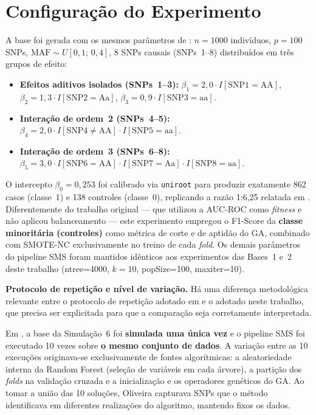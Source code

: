\documentclass[
    12pt,
    a4paper,
    oneside,
    english,
    french,
    spanish,
    brazil
    ]{abntex2}
\newcommand{\novo}[1]{\textcolor{corNova}{#1}}
\begin{document}
\section*{Configuração do Experimento}

\novo{A base foi gerada com os mesmos parâmetros de \citeonline{Oliveira2015}: $n=1000$ indivíduos, $p=100$ SNPs, $\text{MAF}\sim U[0{,}1;\,0{,}4]$, 8 SNPs causais (SNPs~1--8) distribuídos em três grupos de efeito:}

\begin{itemize}
  \item \novo{\textbf{Efeitos aditivos isolados (SNPs~1--3):} $\beta_1=2{,}0\cdot I[\text{SNP1}=\text{AA}]$, $\beta_2=1{,}3\cdot I[\text{SNP2}=\text{Aa}]$, $\beta_3=0{,}9\cdot I[\text{SNP3}=\text{aa}]$.}
  \item \novo{\textbf{Interação de ordem~2 (SNPs~4--5):} $\beta_4=2{,}0\cdot I[\text{SNP4}\neq\text{AA}]\cdot I[\text{SNP5}=\text{aa}]$.}
  \item \novo{\textbf{Interação de ordem~3 (SNPs~6--8):} $\beta_5=3{,}0\cdot I[\text{SNP6}=\text{AA}]\cdot I[\text{SNP7}=\text{Aa}]\cdot I[\text{SNP8}=\text{aa}]$.}
\end{itemize}

\novo{O intercepto $\beta_0=0{,}253$ foi calibrado via \texttt{uniroot} para produzir exatamente 862 casos (classe~1) e 138 controles (classe~0), replicando a razão 1:6,25 relatada em \citeonline{Oliveira2015}. Diferentemente do trabalho original --- que utilizou a AUC-ROC como \textit{fitness} e não aplicou balanceamento --- este experimento empregou o F1-Score da \textbf{classe minoritária (controles)} como métrica de corte e de aptidão do GA, combinado com SMOTE-NC exclusivamente no treino de cada \textit{fold}. Os demais parâmetros do pipeline SMS foram mantidos idênticos aos experimentos das Bases~1 e~2 deste trabalho (ntree=4000, $k=10$, popSize=100, maxiter=10).}

\novo{\textbf{Protocolo de repetição e nível de variação.}
Há uma diferença metodológica relevante entre o protocolo de repetição adotado em \citeonline{Oliveira2015} e o adotado neste trabalho, que precisa ser explicitada para que a comparação seja corretamente interpretada.}

\novo{Em , a base da Simulação~6 foi \textbf{simulada uma única vez} e o pipeline SMS foi executado 10 vezes sobre \textbf{o mesmo conjunto de dados}. A variação entre as 10 execuções originava-se exclusivamente de fontes algorítmicas: a aleatoriedade interna da Random Forest (seleção de variáveis em cada árvore), a partição dos \textit{folds} na validação cruzada e a inicialização e os operadores genéticos do GA. Ao tomar a união das 10 soluções, Oliveira capturava SNPs que o método identificava em diferentes realizações do algoritmo, mantendo fixos os dados.}
\end{document}
